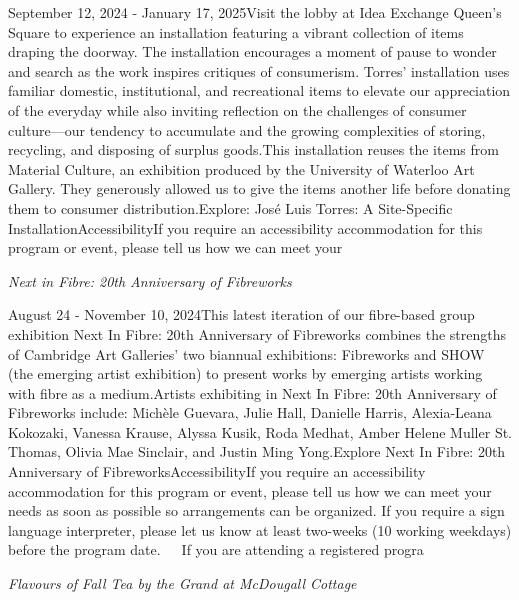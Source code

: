 \documentclass[letterpaper, 10pt]{article}
\newcommand{\subtitle}[1]{\textit{\large #1}\vspace{0.5em}}
\newcommand{\articlecontent}[1]{\small #1\vspace{1em}}
\begin{document}
\begin{multicols}{2}
{September 12, 2024 - January 17, 2025Visit the lobby at Idea Exchange Queen's Square to experience an installation featuring a vibrant collection of items draping the doorway. The installation encourages a moment of pause to wonder and search as the work inspires critiques of consumerism. Torres’ installation uses familiar domestic, institutional, and recreational items to elevate our appreciation of the everyday while also inviting reflection on the challenges of consumer culture—our tendency to accumulate and the growing complexities of storing, recycling, and disposing of surplus goods.This installation reuses the items from Material Culture, an exhibition produced by the University of Waterloo Art Gallery. They generously allowed us to give the items another life before donating them to consumer distribution.Explore: José Luis Torres: A Site-Specific InstallationAccessibilityIf you require an accessibility accommodation for this program or event, please tell us how we can meet your
}
\vspace{10px}

\subtitle{Next in Fibre: 20th Anniversary of Fibreworks}

\articlecontent{

\qrcode[height=1.5cm]{https://ideaexchange.libnet.info/event/11807098}
\vspace{10px}

August 24 - November 10, 2024This latest iteration of our fibre-based group exhibition Next In Fibre: 20th Anniversary of Fibreworks combines the strengths of Cambridge Art Galleries’ two biannual exhibitions: Fibreworks and SHOW (the emerging artist exhibition) to present works by emerging artists working with fibre as a medium.Artists exhibiting in Next In Fibre: 20th Anniversary of Fibreworks include: Michèle Guevara, Julie Hall, Danielle Harris, Alexia-Leana Kokozaki, Vanessa Krause, Alyssa Kusik, Roda Medhat, Amber Helene Muller St. Thomas, Olivia Mae Sinclair, and Justin Ming Yong.Explore Next In Fibre: 20th Anniversary of FibreworksAccessibilityIf you require an accessibility accommodation for this program or event, please tell us how we can meet your needs as soon as possible so arrangements can be organized. If you require a sign language interpreter, please let us know at least two-weeks (10 working weekdays) before the program date.   If you are attending a registered progra
}
\vspace{10px}

\subtitle{Flavours of Fall Tea by the Grand at McDougall Cottage}


\end{multicols}
\end{document}
